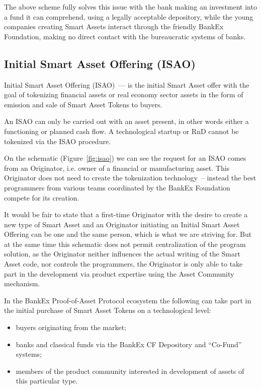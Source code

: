 \documentclass{article}
\begin{document}
\begin{multicols}{2}
The above scheme fully solves this issue with the bank making an investment into a fund it can comprehend, using a legally acceptable depository, while the young companies creating Smart Assets interact through the friendly BankEx Foundation, making no direct contact with the bureaucratic systems of banks. 

\subsection{Initial Smart Asset Offering (ISAO)}

Initial Smart Asset Offering (ISAO)~--- is the initial Smart Asset offer with the goal of tokenizing financial assets or real economy sector assets in the form of emission and sale of Smart Asset Tokens to buyers.

An ISAO can only be carried out with an asset present, in other words either a functioning or planned cash flow. A technological startup or RnD cannot be tokenized via the ISAO procedure.

On the schematic (Figure~\ref{fig:isao}) we can see the request for an ISAO comes from an Originator, i.e. owner of a financial or manufacturing asset. This Originator does not need to create the tokenization technology~-- instead the best programmers from various teams coordinated by the BankEx Foundation compete for its creation.

It would be fair to state that a first-time Originator with the desire to create a new type of Smart Asset and an Originator initiating an Initial Smart Asset Offering can be one and the same person, which is what we are striving for. But at the same time this schematic does not permit centralization of the program solution, as the Originator neither influences the actual writing of the Smart Asset code, nor controls the programmers, the Originator is only able to take part in the development via product expertise using the Asset Community mechanism. 

In the BankEx Proof-of-Asset Protocol ecosystem the following can take part in the initial purchase of Smart Asset Tokens on a technological level:

\begin{itemize}
\item buyers originating from the market;
\item banks and classical funds via the BankEx CF Depository and “Co-Fund” systems;
\item members of the product community interested in development of assets of this particular type.
\end{itemize}


\end{multicols}
\end{document}
